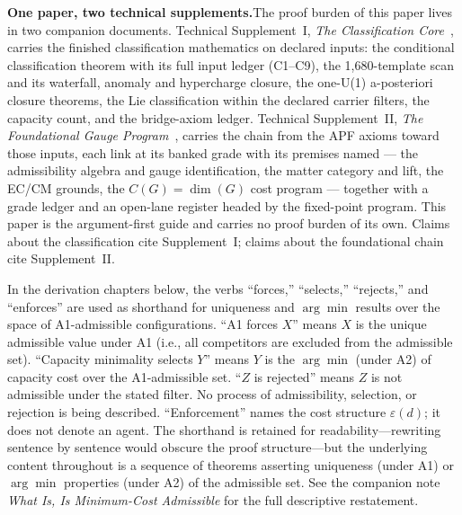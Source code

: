 \documentclass[11pt]{article}
\begin{document}
\medskip\noindent\textbf{One paper, two technical supplements.}\quad The proof burden of this paper lives in two companion documents.  Technical Supplement~I, \emph{The Classification Core}~\cite{BrookeP2Supplement}, carries the finished classification mathematics on declared inputs: the conditional classification theorem with its full input ledger (C1--C9), the 1{,}680-template scan and its waterfall, anomaly and hypercharge closure, the one-U(1) a-posteriori closure theorems, the Lie classification within the declared carrier filters, the capacity count, and the bridge-axiom ledger.  Technical Supplement~II, \emph{The Foundational Gauge Program}~\cite{BrookeP2FoundSupplement}, carries the chain from the APF axioms toward those inputs, each link at its banked grade with its premises named --- the admissibility algebra and gauge identification, the matter category and lift, the EC/CM grounds, the $C(G) = \dim(G)$ cost program --- together with a grade ledger and an open-lane register headed by the fixed-point program.  This paper is the argument-first guide and carries no proof burden of its own.  Claims about the classification cite Supplement~I; claims about the foundational chain cite Supplement~II.



\begin{tcolorbox}[apfbox, title={Descriptive-framing convention (read once, applies throughout)}]
In the derivation chapters below, the verbs ``forces,'' ``selects,'' ``rejects,'' and ``enforces'' are used as shorthand for uniqueness and $\arg\min$ results over the space of A1-admissible configurations.  ``A1 forces $X$'' means $X$ is the unique admissible value under A1 (i.e., all competitors are excluded from the admissible set).  ``Capacity minimality selects $Y$'' means $Y$ is the $\arg\min$ (under A2) of capacity cost over the A1-admissible set.  ``$Z$ is rejected'' means $Z$ is not admissible under the stated filter.  No process of admissibility, selection, or rejection is being described.  ``Enforcement'' names the cost structure $\varepsilon(d)$; it does not denote an agent.  The shorthand is retained for readability---rewriting sentence by sentence would obscure the proof structure---but the underlying content throughout is a sequence of theorems asserting uniqueness (under A1) or $\arg\min$ properties (under A2) of the admissible set.  See the companion note \emph{What Is, Is Minimum-Cost Admissible} for the full descriptive restatement.
\end{tcolorbox}
\end{document}
